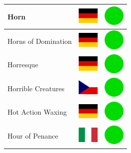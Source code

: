\documentclass[12pt, a4paper, twoside]{report}
\begin{document}
\begin{center}
\begin{longtable}{|p{5cm}|p{2cm}|p{2cm}|}
 Horn                                                       & \includegraphics[width=1cm]{../img/flags/de} &   \includegraphics[width=1cm]{../likes/y} \\ \hline
 Horns of Domination                                        & \includegraphics[width=1cm]{../img/flags/de} &   \includegraphics[width=1cm]{../likes/y} \\ \hline
 Horresque                                                  & \includegraphics[width=1cm]{../img/flags/de} &   \includegraphics[width=1cm]{../likes/y} \\ \hline
 Horrible Creatures                                         & \includegraphics[width=1cm]{../img/flags/cz} &   \includegraphics[width=1cm]{../likes/y} \\ \hline
 Hot Action Waxing                                          & \includegraphics[width=1cm]{../img/flags/de} &   \includegraphics[width=1cm]{../likes/y} \\ \hline
 Hour of Penance                                            & \includegraphics[width=1cm]{../img/flags/it} &   \includegraphics[width=1cm]{../likes/y} \\ \hline

\end{longtable}
\end{center}
\end{document}
